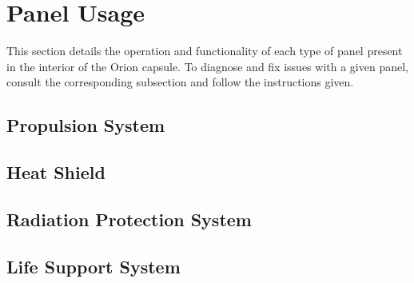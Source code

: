 \documentclass[a4paper,12pt, draft]{article}
\begin{document}
\section*{Panel Usage}

This section details the operation and functionality of each type of panel present in the interior of the Orion capsule. To diagnose and fix issues with a given panel, consult the corresponding subsection and follow the instructions given.

\subsection*{Propulsion System}
\subsection*{Heat Shield}
\subsection*{Radiation Protection System}
\subsection*{Life Support System}
\end{document}
